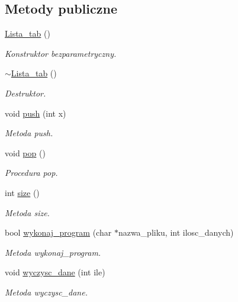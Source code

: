 \subsection*{Metody publiczne}
\begin{DoxyCompactItemize}
\item 
\hyperlink{class_lista__tab_af10d3131eadfebb4df8abbe6379e6d7c}{Lista\-\_\-tab} ()
\begin{DoxyCompactList}\small\item\em Konstruktor bezparametryczny. \end{DoxyCompactList}\item 
\hyperlink{class_lista__tab_aaf55f952c14d2996c6f1e09acd718528}{$\sim$\-Lista\-\_\-tab} ()
\begin{DoxyCompactList}\small\item\em Destruktor. \end{DoxyCompactList}\item 
void \hyperlink{class_lista__tab_a800998768639b41b5be5c52ec4ccbda4}{push} (int x)
\begin{DoxyCompactList}\small\item\em Metoda push. \end{DoxyCompactList}\item 
void \hyperlink{class_lista__tab_affc42a7ffc6eda21076fc56eae38e980}{pop} ()
\begin{DoxyCompactList}\small\item\em Procedura pop. \end{DoxyCompactList}\item 
int \hyperlink{class_lista__tab_af092dd7943f7cd5ff407485f2991a1e4}{size} ()
\begin{DoxyCompactList}\small\item\em Metoda size. \end{DoxyCompactList}\item 
bool \hyperlink{class_lista__tab_ac9adc6ecc7348c5e1871b239c1313405}{wykonaj\-\_\-program} (char $\ast$nazwa\-\_\-pliku, int ilosc\-\_\-danych)
\begin{DoxyCompactList}\small\item\em Metoda wykonaj\-\_\-program. \end{DoxyCompactList}\item 
void \hyperlink{class_lista__tab_a506a6de79a600bac8316a6caf9878528}{wyczysc\-\_\-dane} (int ile)
\begin{DoxyCompactList}\small\item\em Metoda wyczysc\-\_\-dane. \end{DoxyCompactList}\item 

\end{DoxyCompactItemize}
